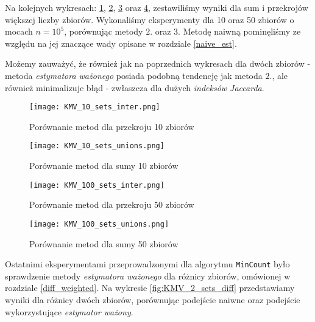 Na kolejnych wykresach: \ref{fig:KMV_10sets_inter}, \ref{fig:KMV_10sets_unions}, \ref{fig:KMV_100sets_inter} oraz \ref{fig:KMV_100sets_unions}, zestawiliśmy wyniki dla sum i przekrojów większej liczby zbiorów. Wykonaliśmy eksperymenty dla 10 oraz 50 zbiorów o mocach $n = 10^5$, porównując metody $2.$ oraz $3.$ Metodę naiwną pominęliśmy ze względu na jej znaczące wady opisane w rozdziale \ref{naive_est}. 

Możemy zauważyć, że również jak na poprzednich wykresach dla dwóch zbiorów - metoda \textit{estymatora ważonego} posiada podobną tendencję jak metoda $2.$, ale również minimalizuje błąd - zwłaszcza dla dużych \textit{indeksów Jaccarda}.

\begin{figure}[h!]
    \texttt{[image: KMV\_10\_sets\_inter.png]}
    \centering
    \caption{Porównanie metod dla przekroju 10 zbiorów}
    \label{fig:KMV_10sets_inter}
\end{figure}

\begin{figure}[h!]
    \texttt{[image: KMV\_10\_sets\_unions.png]}
    \centering
    \caption{Porównanie metod dla sumy 10 zbiorów}
    \label{fig:KMV_10sets_unions}
\end{figure}

\begin{figure}[h!]
    \texttt{[image: KMV\_100\_sets\_inter.png]}
    \centering
    \caption{Porównanie metod dla przekroju 50 zbiorów}
    \label{fig:KMV_100sets_inter}
\end{figure}

\begin{figure}[h!]
    \texttt{[image: KMV\_100\_sets\_unions.png]}
    \centering
    \caption{Porównanie metod dla sumy 50 zbiorów}
    \label{fig:KMV_100sets_unions}
\end{figure}

Ostatnimi eksperymentami przeprowadzonymi dla algorytmu \texttt{MinCount} było sprawdzenie metody \textit{estymatora ważonego} dla różnicy zbiorów, omówionej w rozdziale \ref{diff_weighted}. Na wykresie \ref{fig:KMV_2_sets_diff} przedstawiamy wyniki dla różnicy dwóch zbiorów, porównując podejście naiwne oraz podejście wykorzystujące \textit{estymator ważony}.

